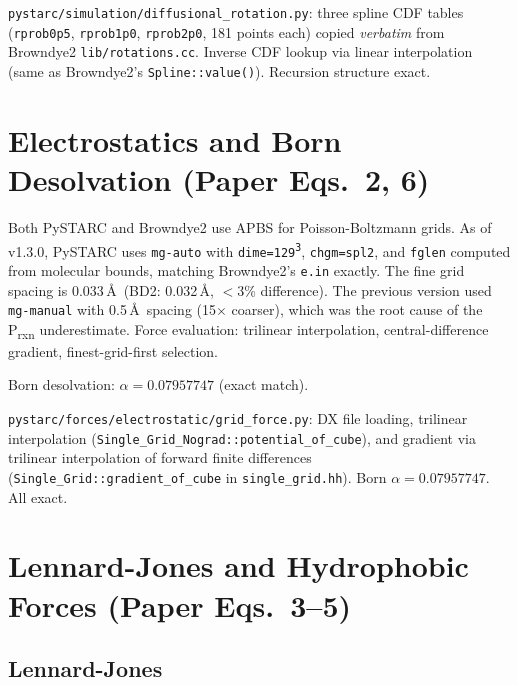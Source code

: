 \documentclass[12pt,a4paper]{article}
\newcommand{\OK}{\textcolor{cgreen}{\checkmark}}
\begin{document}
\begin{samebox}
\texttt{pystarc/simulation/diffusional\_rotation.py}: three spline CDF tables
(\texttt{rprob0p5}, \texttt{rprob1p0}, \texttt{rprob2p0}, 181 points each)
copied \emph{verbatim} from Browndye2 \texttt{lib/rotations.cc}.
Inverse CDF lookup via linear interpolation (same as Browndye2's \texttt{Spline::value()}).
Recursion structure exact. \OK
\end{samebox}

\section{Electrostatics and Born Desolvation (Paper Eqs.~2, 6)}

Both PySTARC and Browndye2 use APBS for Poisson-Boltzmann grids.
As of v1.3.0, PySTARC uses \texttt{mg-auto} with \texttt{dime=129\textsuperscript{3}},
\texttt{chgm=spl2}, and \texttt{fglen} computed from molecular bounds,
matching Browndye2's \texttt{e.in} exactly. The fine grid spacing is 0.033\,\AA\ 
(BD2: 0.032\,\AA, $<$3\% difference).
The previous version used \texttt{mg-manual} with 0.5\,\AA\ spacing (15$\times$ coarser),
which was the root cause of the P\textsubscript{rxn} underestimate.
Force evaluation: trilinear interpolation, central-difference gradient,
finest-grid-first selection.

Born desolvation: $\alpha = 0.07957747$ (exact match).

\begin{samebox}
\texttt{pystarc/forces/electrostatic/grid\_force.py}: DX file loading, trilinear
interpolation (\texttt{Single\_Grid\_Nograd::potential\_of\_cube}), and
gradient via trilinear interpolation of forward finite differences
(\texttt{Single\_Grid::gradient\_of\_cube} in \texttt{single\_grid.hh}).
Born $\alpha = 0.07957747$.  All exact. \OK
\end{samebox}

\section{Lennard-Jones and Hydrophobic Forces (Paper Eqs.~3--5)}

\subsection{Lennard-Jones}
\end{document}
